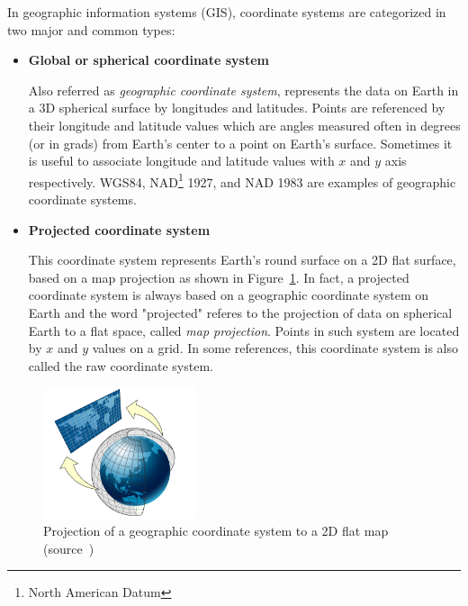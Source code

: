 \documentclass[a4paper,12pt]{article}
\begin{document}
  
In geographic information systems (GIS), coordinate systems are categorized in two major and common types:
\begin{itemize}
\item \textbf{Global or spherical coordinate system} 

Also referred as \textit{geographic coordinate system}, represents the data on Earth in a 3D spherical surface by longitudes and latitudes. Points are referenced by their longitude and latitude values which are angles measured often in degrees (or in grads) from Earth's center to a point on Earth's surface. Sometimes it is useful to associate longitude and latitude values with $x$ and $y$ axis respectively. WGS84, NAD\footnote{North American Datum} 1927, and NAD 1983 are examples of geographic coordinate systems. 

\item \textbf{Projected coordinate system} 

This coordinate system represents Earth's round surface on a 2D flat surface, based on a map projection as shown in Figure~\ref{figproject}. In fact, a projected coordinate system is always based on a geographic coordinate system on Earth and the word "projected" referes to the projection of data on spherical Earth to a flat space, called \textit{map projection}. Points in such system are located by $x$ and $y$ values on a grid. 
In some references, this coordinate system is also called the raw coordinate system.
\end{itemize}

\begin{figure}
\centering
\includegraphics[width=0.4\textwidth]{sphere_to_cylinder}
\caption{Projection of a geographic coordinate system to a 2D flat map (source~\cite{projected})}
\label{figproject}
\end{figure}
\end{document}
